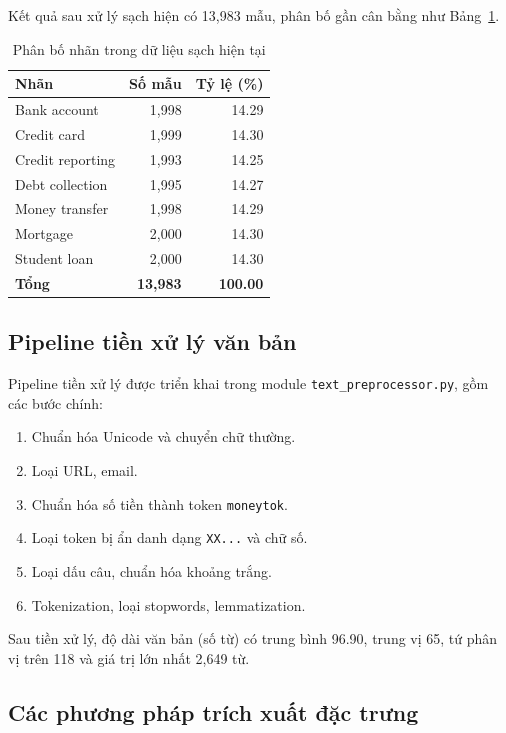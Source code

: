 Kết quả sau xử lý sạch hiện có 13{,}983 mẫu, phân bố gần cân bằng như Bảng~\ref{tab:class_dist}.

\begin{table}[H]
\centering
\caption{Phân bố nhãn trong dữ liệu sạch hiện tại}
\label{tab:class_dist}
\begin{tabular}{lrr}
\toprule
\textbf{Nhãn} & \textbf{Số mẫu} & \textbf{Tỷ lệ (\%)} \\
\midrule
Bank account & 1{,}998 & 14.29 \\
Credit card & 1{,}999 & 14.30 \\
Credit reporting & 1{,}993 & 14.25 \\
Debt collection & 1{,}995 & 14.27 \\
Money transfer & 1{,}998 & 14.29 \\
Mortgage & 2{,}000 & 14.30 \\
Student loan & 2{,}000 & 14.30 \\
\midrule
\textbf{Tổng} & \textbf{13{,}983} & \textbf{100.00} \\
\bottomrule
\end{tabular}
\end{table}

\subsection{Pipeline tiền xử lý văn bản}
Pipeline tiền xử lý được triển khai trong module \texttt{text\_preprocessor.py}, gồm các bước chính:
\begin{enumerate}[nosep]
    \item Chuẩn hóa Unicode và chuyển chữ thường.
    \item Loại URL, email.
    \item Chuẩn hóa số tiền thành token \texttt{moneytok}.
    \item Loại token bị ẩn danh dạng \texttt{XX...} và chữ số.
    \item Loại dấu câu, chuẩn hóa khoảng trắng.
    \item Tokenization, loại stopwords, lemmatization.
\end{enumerate}

Sau tiền xử lý, độ dài văn bản (số từ) có trung bình 96.90, trung vị 65, tứ phân vị trên 118 và giá trị lớn nhất 2{,}649 từ.

\subsection{Các phương pháp trích xuất đặc trưng}
